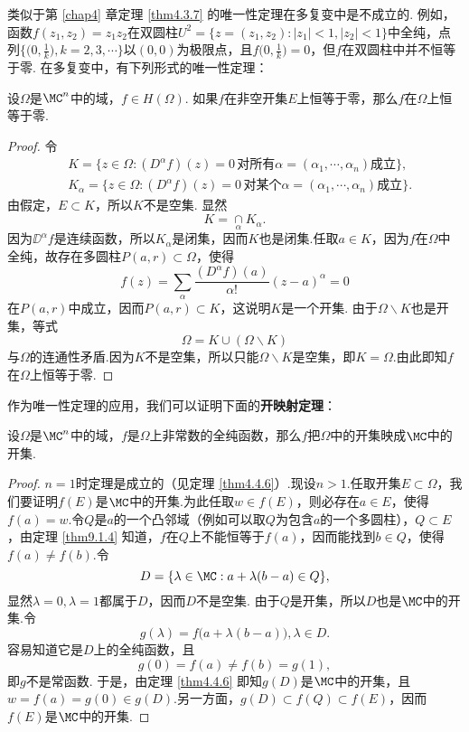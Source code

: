 类似于第 \ref{chap4} 章定理 \ref{thm4.3.7} 的唯一性定理在多复变中是不成立的. 例如，函数$f(z_1,z_2)=z_1z_2$在双圆柱$U^2=\{z=(z_1,z_2):|z_1|<1,|z_2|<1\}$中全纯，点列$\bigg\{\bigg(0,\frac1k\bigg),k=2,3,\cdots\bigg\}$以$(0,0)$为极限点，且$f\bigg(0,\frac1k\bigg)=0$，但$f$在双圆柱中并不恒等于零. 在多复变中，有下列形式的唯一性定理：
\begin{theorem}\label{thm9.1.4}
设$\Omega$是$\MC^n$中的域，$f\in H(\Omega)$. 如果$f$在非空开集$E$上恒等于零，那么$f$在$\Omega$上恒等于零.
\end{theorem}
\begin{proof}
令
\begin{align*}
&K=\{z\in\Omega:(D^\alpha f)(z)=0\,\mbox{对所有$\alpha=(\alpha_1,\cdots,\alpha_n)$成立}\},\\
&K_\alpha=\{z\in\Omega:(D^\alpha f)(z)=0\,\mbox{对某个$\alpha=(\alpha_1,\cdots,\alpha_n)$成立}\}.
\end{align*}
由假定，$E\subset K$，所以$K$不是空集. 显然
\[K=\operatorname*{\cap}_\alpha K_\alpha.\]
因为$\DD^\alpha f$是连续函数，所以$K_\alpha$是闭集，因而$K$也是闭集.任取$a\in K$，因为$f$在$\Omega$中全纯，故存在多圆柱$P(a,r)\subset \Omega$，使得
\[f(z)=\sum_\alpha\frac{(D^\alpha f)(a)}{\alpha!}(z-a)^\alpha=0\]
在$P(a,r)$中成立，因而$P(a,r)\subset K$，这说明$K$是一个开集. 由于$\Omega\backslash K$也是开集，等式
\[\Omega=K\cup(\Omega\backslash K)\]
与$\Omega$的连通性矛盾.因为$K$不是空集，所以只能$\Omega\backslash K$是空集，即$K=\Omega$.由此即知$f$在$\Omega$上恒等于零.
\end{proof}

作为唯一性定理的应用，我们可以证明下面的\textbf{开映射定理}：
\begin{theorem}\label{thm9.1.5}
设$\Omega$是$\MC^n$中的域，$f$是$\Omega$上非常数的全纯函数，那么$f$把$\Omega$中的开集映成$\MC$中的开集.
\end{theorem}
\begin{proof}
$n=1$时定理是成立的（见定理 \ref{thm4.4.6}）.现设$n>1$.任取开集$E\subset\Omega$，我们要证明$f(E)$是$\MC$中的开集.为此任取$w\in f(E)$，则必存在$a\in E$，使得$f(a)=w$.令$Q$是$a$的一个凸邻域（例如可以取$Q$为包含$a$的一个多圆柱），$Q\subset E$，由定理 \ref{thm9.1.4} 知道，$f$在$Q$上不能恒等于$f(a)$，因而能找到$b\in Q$，使得$f(a)\ne f(b)$.令
\[D=\{\lambda\in\MC:a+\lambda(b-a)\in Q\},\]
显然$\lambda=0,\lambda=1$都属于$D$，因而$D$不是空集. 由于$Q$是开集，所以$D$也是$\MC$中的开集.令
\[g(\lambda)=f\big(a+\lambda(b-a)\big),\lambda\in D.\]
容易知道它是$D$上的全纯函数，且
\[g(0)=f(a)\ne f(b)=g(1),\]
即$g$不是常函数. 于是，由定理 \ref{thm4.4.6} 即知$g(D)$是$\MC$中的开集，且$w=f(a)=g(0)\in g(D)$.另一方面，$g(D)\subset f(Q)\subset f(E)$，因而$f(E)$是$\MC$中的开集.
\end{proof}

